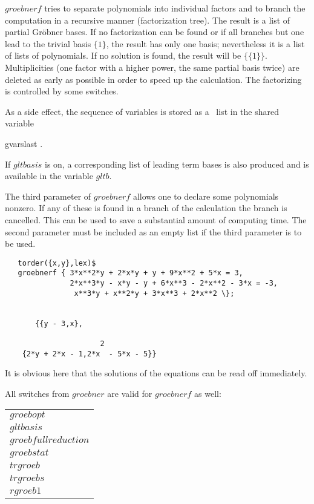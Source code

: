 $groebnerf$ tries to separate polynomials into individual factors and
to branch the computation in a recursive manner (factorization tree).
The result is a list of partial Gr\"obner bases. If no factorization can
be found or if all branches but one lead to the trivial basis $\{1\}$,
the result has only one basis; nevertheless it is a list of lists of
polynomials. If no solution is found, the result will be $\{\{1\}\}$.
Multiplicities (one factor with a higher power, the same partial basis
twice) are deleted as early as possible in order to speed up the
calculation. The factorizing is controlled by some switches.

As a side effect, the sequence of variables is stored as a \REDUCE \  list in
the shared variable
\begin{center}
gvarslast .
\end{center}
If $gltbasis$ is on, a corresponding list of leading term bases is
also produced and is available in the variable $gltb$.

The third parameter of $groebnerf$ allows one to declare some polynomials
nonzero. If any of these is found in a branch of the calculation
the branch is cancelled. This can be used to save a substantial amount
of computing time. The second parameter must be included as an
empty list if the third parameter is to be used.

\begin{verbatim}
   torder({x,y},lex)$
   groebnerf { 3*x**2*y + 2*x*y + y + 9*x**2 + 5*x = 3,
               2*x**3*y - x*y - y + 6*x**3 - 2*x**2 - 3*x = -3,
                x**3*y + x**2*y + 3*x**3 + 2*x**2 \};


       {{y - 3,x},

                      2
    {2*y + 2*x - 1,2*x  - 5*x - 5}}
\end{verbatim}

It is obvious here that the solutions of the equations can be read
off immediately.

All switches from $groebner$ are valid for $groebnerf$ as well:
  
  
 
\begin{center}
\begin{tabular}{l}
$groebopt$ \\
$gltbasis$ \\
$groebfullreduction$ \\
$groebstat$ \\
$trgroeb$ \\
$trgroebs$ \\
$rgroeb1$
\end{tabular}
\end{center}

